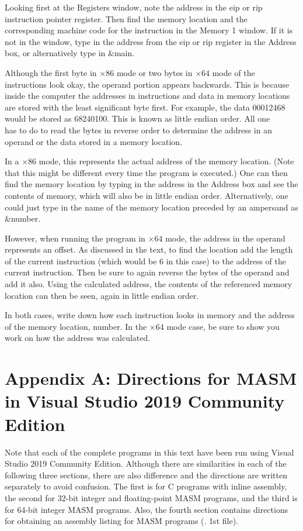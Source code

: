 \documentclass[10pt]{article}
\begin{document}
Looking first at the Registers window, note the address in the eip or rip instruction pointer register. Then find the memory location and the corresponding machine code for the instruction in the Memory 1 window. If it is not in the window, type in the address from the eip or rip register in the Address box, or alternatively type in \&main.

Although the first byte in $\times 86$ mode or two bytes in $\times 64$ mode of the instructions look okay, the operand portion appears backwards. This is because inside the computer the addresses in instructions and data in memory locations are stored with the least significant byte first. For example, the data 00012468 would be stored as 68240100. This is known as little endian order. All one\\
has to do to read the bytes in reverse order to determine the address in an operand or the data stored in a memory location.

In a $\times 86$ mode, this represents the actual address of the memory location. (Note that this might be different every time the program is executed.) One can then find the memory location by typing in the address in the Address box and see the contents of memory, which will also be in little endian order. Alternatively, one could just type in the name of the memory location preceded by an ampersand as \&number.

However, when running the program in $\times 64$ mode, the address in the operand represents an offset. As discussed in the text, to find the location add the length of the current instruction (which would be 6 in this case) to the address of the current instruction. Then be sure to again reverse the bytes of the operand and add it also. Using the calculated address, the contents of the referenced memory location can then be seen, again in little endian order.

In both cases, write down how each instruction looks in memory and the address of the memory location, number. In the $\times 64$ mode case, be sure to show you work on how the address was calculated.

\section*{Appendix A: Directions for MASM in Visual Studio 2019 Community Edition}
Note that each of the complete programs in this text have been run using Visual Studio 2019 Community Edition. Although there are similarities in each of the following three sections, there are also difference and the directions are written separately to avoid confusion. The first is for C programs with inline assembly, the second for 32-bit integer and floating-point MASM programs, and the third is for 64-bit integer MASM programs. Also, the fourth section contains directions for obtaining an assembly listing for MASM programs (. 1st file).
\end{document}
